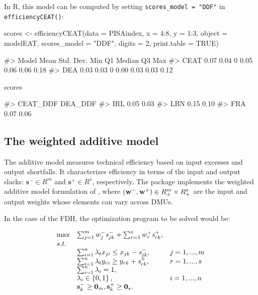 In R, this model can be computed by setting
\texttt{scores\_model\ =\ "DDF"} in \texttt{efficiencyCEAT()}:

\begin{Schunk}
\begin{Sinput}
scores <- efficiencyCEAT(data = PISAindex, x = 4:8, y = 1:3, object = modelEAT, 
                         scores_model = "DDF", digits = 2, 
                         print.table = TRUE)
\end{Sinput}
\begin{Soutput}
#>  Model Mean Std. Dev. Min   Q1 Median   Q3  Max
#>   CEAT 0.07      0.04   0 0.05   0.06 0.06 0.18
#>    DEA 0.03      0.03   0 0.00   0.03 0.03 0.12
\end{Soutput}
\begin{Sinput}
scores %>% sample_n(3)
\end{Sinput}
\begin{Soutput}
#>     CEAT_DDF DEA_DDF
#> IRL     0.05    0.03
#> LBN     0.15    0.10
#> FRA     0.07    0.06
\end{Soutput}
\end{Schunk}

\hypertarget{the-weighted-additive-model}{%
\subsection{The weighted additive
model}\label{the-weighted-additive-model}}

The additive model measures technical efficiency based on input excesses
and output shortfalls. It characterizes efficiency in terms of the input
and output slacks: \(\textbf{s}^{-} \in R^{m}\) and
\(\textbf{s}^{+} \in R^{s}\), respectively. The  package
implements the weighted additive model formulation of
\citet{lovell1995}, where
\(({\it \textbf{w}}^{-} ,{\it \textbf{w}}^{+})\in R_{+}^{m} \times R_{+}^{s}\)
are the input and output weights whose elements can vary across DMUs.

In the case of the FDH, the optimization program to be solved would be:

\begin{equation} \label{(31)} 
\begin{array}{lllll} 
{} & {\max } & {\sum_{j=1}^{m}w_{j}^{-} {\it s}_{jk}^{-} + \sum_{r=1}^{s}w_{r}^{+} {\it s}_{rk}^{+},} & {} & {} \\
{} & {s.t.} & {} & {} & {} \\ 
{} & {} & {\sum_{i=1}^{n}\lambda_{t} x_{ji} \le x_{jk} - {\it s}_{jk}^{-} ,} & {j=1,...,m} & {} \\ 
{} & {} & {\sum_{i=1}^{n}\lambda_{t} y_{ri} \ge y_{rk} + {\it s}_{rk}^{+} ,} & {r=1,...,s} & {} \\ 
{} & {} & {\sum_{i=1}^{n}\lambda_{i} = 1,} & {} & {} \\ 
{} & {} & {\lambda _{i} \in \left\{0,1\right\},} & {i=1,...,n} & {} \\ 
{} & {} & {{\it \textbf{s}}_{k}^{-} \ge \textbf{0}_{m}, {\it \textbf{s}}_{k}^{+} \ge \textbf{0}_{s}.} 
\end{array}
\end{equation}


